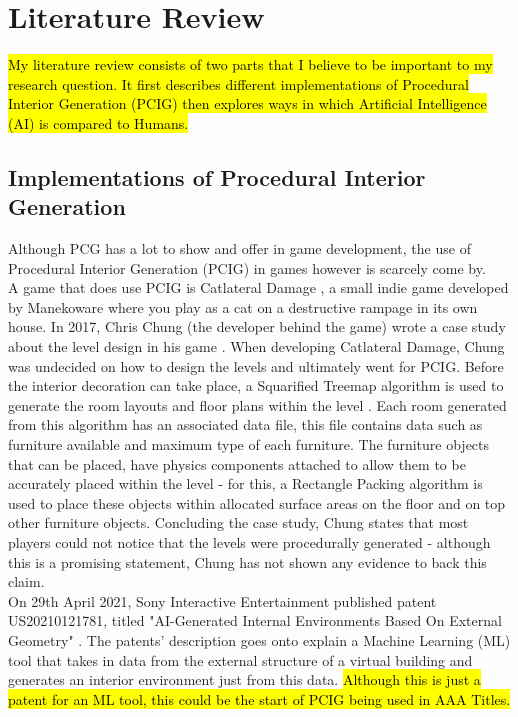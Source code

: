 \section{Literature Review}
\hl{My literature review consists of two parts that I believe to be important to my research question. It first describes different implementations of Procedural Interior Generation (PCIG) then explores ways in which Artificial Intelligence (AI) is compared to Humans.}

\subsection{Implementations of Procedural Interior Generation}
Although PCG has a lot to show and offer in game development, the use of Procedural Interior Generation (PCIG) in games however is scarcely come by.
\\
A game that does use PCIG is Catlateral Damage \cite{game:catlateral},
a small indie game developed by Manekoware where you play as a cat on a destructive rampage 
in its own house. In 2017, Chris Chung (the developer behind the game) wrote a case study about the level design in his game \cite[Chapter~6]{pcg_in_gd}. When developing Catlateral Damage, Chung was undecided on how to design the levels and ultimately went for PCIG\cite[Chapter~6]{pcg_in_gd}. Before the interior decoration can take place, a Squarified Treemap algorithm is used to generate the room layouts and floor plans within the level \cite{squarified-treemap}. Each room generated from this algorithm has an associated data file, this file contains data such as furniture available and maximum type of each furniture. The furniture objects that can be placed, have physics components attached to allow them to be accurately placed within the level - for this, a Rectangle Packing algorithm \cite{rectangle-packing} is used to place these objects within allocated surface areas on the floor and on top other furniture objects. Concluding the case study, Chung states that most players could not notice that the levels were procedurally generated - although this is a promising statement, Chung has not shown any evidence to back this claim.
\\
On 29th April 2021, Sony Interactive Entertainment published patent US20210121781, titled "AI-Generated Internal Environments Based On External Geometry" \cite{sony-patent}. The patents' description goes onto explain a Machine Learning (ML) tool that takes in data from the external structure of a virtual building and generates an interior environment just from this data. \hl{Although this is just a patent for an ML tool, this could be the start of PCIG being used in AAA Titles. }
\bigskip


